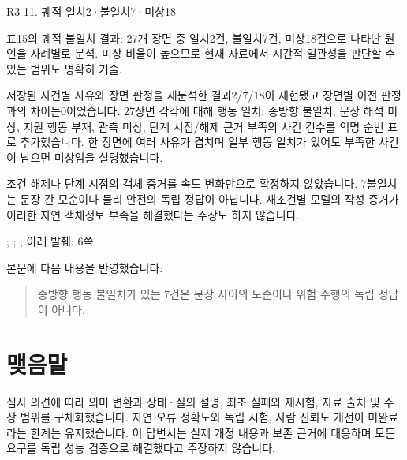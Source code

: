 \begin{reviewitem}{R3-11. 궤적 일치2·불일치7·미상18}

\begin{reviewercomment}

표15의 궤적 불일치 결과: 27개 장면 중 일치2건, 불일치7건, 미상18건으로 나타난 원인을 사례별로 분석. 미상 비율이 높으므로 현재 자료에서 시간적 일관성을 판단할 수 있는 범위도 명확히 기술.

\end{reviewercomment}

\begin{authorresponse}

저장된 사건별 사유와 장면 판정을 재분석한 결과2/7/18이 재현됐고 장면별 이전 판정과의 차이는0이었습니다. 27장면 각각에 대해 행동 일치, 종방향 불일치, 문장 해석 미상, 지원 행동 부재, 관측 미상, 단계 시점/해제 근거 부족의 사건 건수를 익명 순번 표로 추가했습니다. 한 장면에 여러 사유가 겹치며 일부 행동 일치가 있어도 부족한 사건이 남으면 미상임을 설명했습니다.

조건 해제나 단계 시점의 객체 증거를 속도 변화만으로 확정하지 않았습니다. 7불일치는 문장 간 모순이나 물리 안전의 독립 정답이 아닙니다. 새조건별 모델의 작성 증거가 이러한 자연 객체정보 부족을 해결했다는 주장도 하지 않습니다.

\end{authorresponse}

\begin{manuscriptrevision}{; ; ; 아래 발췌: 6쪽}

본문에 다음 내용을 반영했습니다.

\begin{quote}

종방향 행동 불일치가 있는 7건은 문장 사이의 모순이나 위험 주행의 독립 정답이 아니다.

\end{quote}

\end{manuscriptrevision}

\end{reviewitem}

\section*{맺음말}

심사 의견에 따라 의미 변환과 상태·질의 설명, 최초 실패와 재시험, 자료 출처 및 주장 범위를 구체화했습니다. 자연 오류 정확도와 독립 시험, 사람 신뢰도 개선이 미완료라는 한계는 유지했습니다. 이 답변서는 실제 개정 내용과 보존 근거에 대응하며 모든 요구를 독립 성능 검증으로 해결했다고 주장하지 않습니다.


